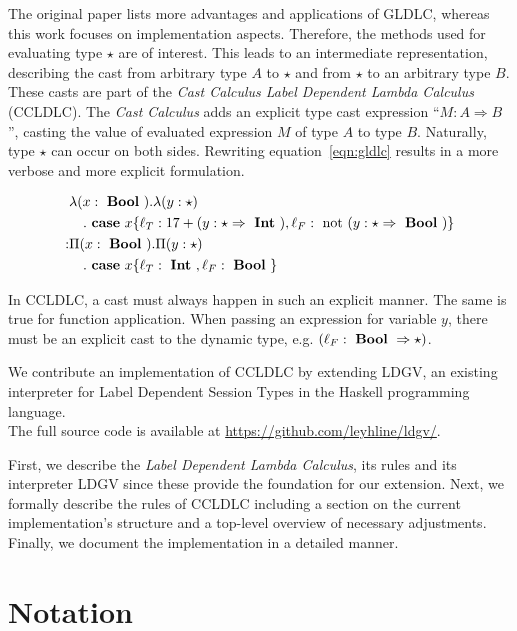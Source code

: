 The original paper lists more advantages and applications of GLDLC, whereas this work focuses on implementation aspects. Therefore, the methods used for evaluating type $\star$ are of interest. This leads to an intermediate representation, describing the cast from arbitrary type $A$ to $\star$ and from $\star$ to an arbitrary type $B$. These casts are part of the \emph{Cast Calculus Label Dependent Lambda Calculus} (CCLDLC). The \emph{Cast Calculus} adds an explicit type cast expression ``$M : A \Rightarrow B$'', casting the value of evaluated expression $M$ of type $A$ to type $B$. Naturally, type $\star$ can occur on both sides. Rewriting equation~\ref{eqn:gldlc} results in a more verbose and more explicit formulation.

\begin{equation}\label{eqn:ccldlc}
\begin{split}
&\lambda (x: \text{ \textbf{Bool} }) . \lambda (y: \star ) \\
&\quad . \text{ \textbf{case} } x \{\ell_T: 17+(y:\star \Rightarrow \text{ \textbf{Int} }),\ell_F: \text{ not } (y:\star \Rightarrow \text{ \textbf{Bool} })\} \\
: & \Pi(x : \text{ \textbf{Bool} }) . \Pi (y: \star ) \\
&\quad . \text{ \textbf{case} } x \{\ell_T: \text{ \textbf{Int} }, \ell_F: \text{ \textbf{Bool} } \}
\end{split}
\end{equation}

In CCLDLC, a cast must always happen in such an explicit manner. The same is true for function application. When passing an expression for variable $y$, there must be an explicit cast to the dynamic type, e.g. $(\ell_F : \text{ \textbf{Bool} } \Rightarrow \star)$.

We contribute an implementation of CCLDLC by extending LDGV, an existing interpreter for Label Dependent Session Types in the Haskell programming language.
\\
The full source code is available at \url{https://github.com/leyhline/ldgv/}.

First, we describe the \emph{Label Dependent Lambda Calculus}, its rules and its interpreter LDGV since these provide the foundation for our extension. Next, we formally describe the rules of CCLDLC including a section on the current implementation's structure and a top-level overview of necessary adjustments. Finally, we document the implementation in a detailed manner.

\section{Notation}

